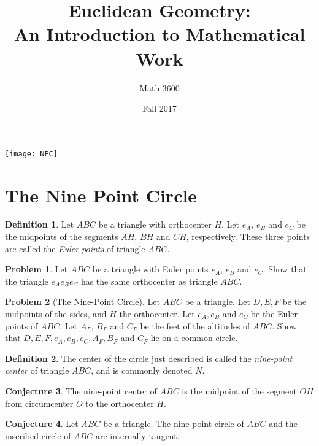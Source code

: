 \documentclass{tufte-handout}
\title{Euclidean Geometry:\\An Introduction to Mathematical Work}
\author[]{Math 3600}
\date{Fall 2017}
\theoremstyle{definition}
\newtheorem{problem}{Problem}[section]
\newtheorem{conjecture}[problem]{Conjecture}
\newtheorem*{definition}{Definition}
\begin{document}
\maketitle

\begin{marginfigure}
    \texttt{[image: NPC]}
\end{marginfigure}

\setcounter{section}{18}
\section{The Nine Point Circle}


\begin{definition} Let $ABC$ be a triangle with orthocenter $H$. Let $e_A$, $e_B$ and $e_C$ be the midpoints of the segments $AH$, $BH$ and $CH$, respectively. These three points are called the \emph{Euler points} of triangle $ABC$.
\end{definition}

\begin{problem} Let $ABC$ be a triangle with Euler points $e_A$, $e_B$ and $e_C$. Show that the triangle $e_A e_B e_C$ has the same orthocenter as triangle $ABC$.
\end{problem}

\begin{problem}[The Nine-Point Circle]\label{prob:nine-pt-circle}
Let $ABC$ be a triangle. Let $D, E, F$ be the midpoints of the sides, and $H$ the orthocenter. Let $e_A, e_B$ and $e_C$ be the Euler points of $ABC$. Let $A_F$, $B_F$ and $C_F$ be the feet of the altitudes of $ABC$. Show that $D, E, F, e_A, e_B, e_C, A_F, B_F$ and $C_F$ lie on a common circle.
\end{problem}



\begin{definition} The center of the circle just described is called the \emph{nine-point center} of triangle $ABC$, and is commonly denoted $N$.
\end{definition}

\begin{conjecture} The nine-point center of $ABC$ is the midpoint of the segment $OH$ from circumcenter $O$ to the orthocenter $H$.
\end{conjecture}

\begin{conjecture} Let $ABC$ be a triangle. The nine-point circle of $ABC$ and the inscribed circle of $ABC$ are internally tangent.
\end{conjecture}

\vfill
\end{document}
